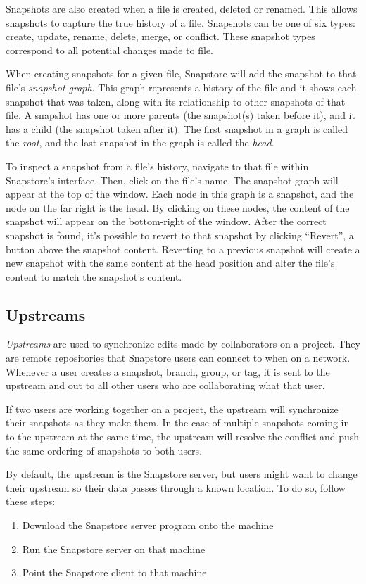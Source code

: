 Snapshots are also created when a file is created, deleted or renamed. This allows snapshots to capture the true history of a file. Snapshots can be one of six types: create, update, rename, delete, merge, or conflict. These snapshot types correspond to all potential changes made to file.

When creating snapshots for a given file, Snapstore will add the snapshot to that file's \textit{snapshot graph}. This graph represents a history of the file and it shows each snapshot that was taken, along with its relationship to other snapshots of that file. A snapshot has one or more parents (the snapshot(s) taken before it), and it has a child (the snapshot taken after it). The first snapshot in a graph is called the \textit{root}, and the last snapshot in the graph is called the \textit{head}.

To inspect a snapshot from a file's history, navigate to that file within Snapstore's interface. Then, click on the file's name. The snapshot graph will appear at the top of the window. Each node in this graph is a snapshot, and the node on the far right is the head. By clicking on these nodes, the content of the snapshot will appear on the bottom-right of the window. After the correct snapshot is found, it's possible to revert to that snapshot by clicking ``Revert'', a button above the snapshot content. Reverting to a previous snapshot will create a new snapshot with the same content at the head position and alter the file's content to match the snapshot's content.

\subsection{Upstreams}

\textit{Upstreams} are used to synchronize edits made by collaborators on a project. They are remote repositories that Snapstore users can connect to when on a network. Whenever a user creates a snapshot, branch, group, or tag, it is sent to the upstream and out to all other users who are collaborating what that user.

If two users are working together on a project, the upstream will synchronize their snapshots as they make them. In the case of multiple snapshots coming in to the upstream at the same time, the upstream will resolve the conflict and push the same ordering of snapshots to both users.

By default, the upstream is the Snapstore server, but users might want to change their upstream so their data passes through a known location. To do so, follow these steps:
\begin{enumerate}
  \item{Download the Snapstore server program onto the machine}
  \item{Run the Snapstore server on that machine}
  \item{Point the Snapstore client to that machine}
\end{enumerate}


